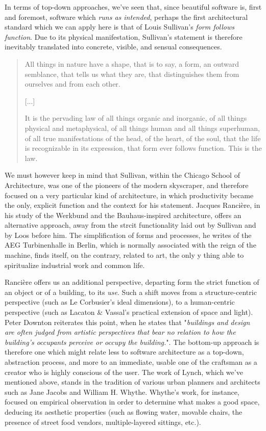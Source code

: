 \documentclass{article}
\begin{document}
In terms of top-down approaches, we've seen that, since beautiful software is, first and foremost, software which \emph{runs as intended}, perhaps the first architectural standard which we can apply here is that of Louis Sullivan's \emph{form follows function}. Due to its physical manifestation, Sullivan's statement is therefore inevitably translated into concrete, visible, and sensual consequences.

\begin{quote}
  All things in nature have a shape, that is to say, a form, an outward semblance, that tells us what they are, that distinguishes them from ourselves and from each other.

  [...]

  It is the pervading law of all things organic and inorganic, of all things physical and metaphysical, of all things human and all things superhuman, of all true manifestations of the head, of the heart, of the soul, that the life is recognizable in its expression, that form ever follows function. This is the law.\cite{sullivan_tall_1896}
\end{quote}

We must however keep in mind that Sullivan, within the Chicago School of Architecture, was one of the pioneers of the modern skyscraper, and therefore focused on a very particular kind of architecture, in which productivity became the only, explicit function and the context for his statement. Jacques Rancière, in his study of the Werkbund and the Bauhaus-inspired architecture, offers an alternative approach, away from the strcit functionality laid out by Sullivan and by Loos before him. The simplification of forms and processes, he writes of the AEG Turbinenhalle in Berlin, which is normally associated with the reign of the machine, finds itself, on the contrary, related to art, the only y thing able to spiritualize industrial work and common life\cite{ranciere_aisthesis_2013}.

Rancière offers us an additional perspective, departing form the strict function of an object or of a building, to its \emph{use}. Such a shift moves from a structure-centric perspective (such as Le Corbusier's ideal dimensions), to a human-centric perspective (such as Lacaton \& Vassal's practical extension of space and light). Peter Downton reiterates this point, when he states that "\emph{buildings and design are often judged from artistic perspectives that bear no relation to how the building’s occupants perceive or occupy the building.}"\cite{downton_knowledge_1998}. The bottom-up approach is therefore one which might relate less to software architecture as a top-down, abstraction process, and more to an immediate, usable one of the craftsman as a creator who is highly conscious of the user. The work of Lynch, which we've mentioned above, stands in the tradition of various urban planners and architects such as Jane Jacobs and William H. Whythe. Whythe's work, for instance, focused on empirical observation in order to determine what makes a good space, deducing its aesthetic properties (such as flowing water, movable chairs, the presence of street food vendors, multiple-layered sittings, etc.).
\end{document}
